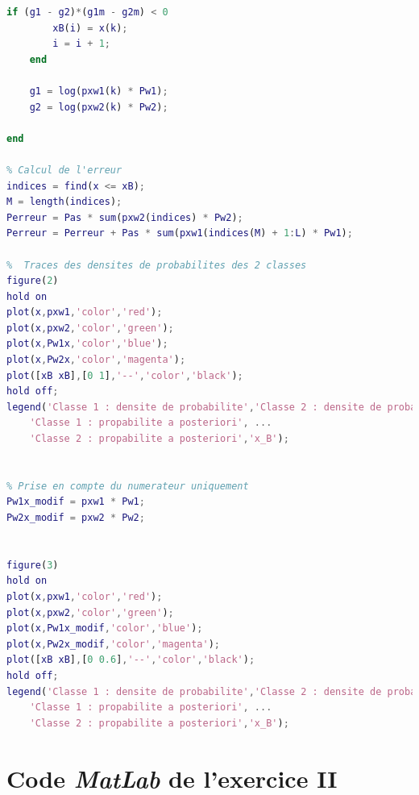 \documentclass[11pt,a4paper]{article}
\begin{document}
\begin{lstlisting}[language=matlab]
    if (g1 - g2)*(g1m - g2m) < 0
        xB(i) = x(k);
        i = i + 1;
    end
    
    g1 = log(pxw1(k) * Pw1);
    g2 = log(pxw2(k) * Pw2);
    
end

% Calcul de l'erreur
indices = find(x <= xB);
M = length(indices);
Perreur = Pas * sum(pxw2(indices) * Pw2);
Perreur = Perreur + Pas * sum(pxw1(indices(M) + 1:L) * Pw1);

%  Traces des densites de probabilites des 2 classes
figure(2) 
hold on
plot(x,pxw1,'color','red');
plot(x,pxw2,'color','green');
plot(x,Pw1x,'color','blue');
plot(x,Pw2x,'color','magenta');
plot([xB xB],[0 1],'--','color','black');
hold off;
legend('Classe 1 : densite de probabilite','Classe 2 : densite de probabilite', ...
	'Classe 1 : propabilite a posteriori', ...
	'Classe 2 : propabilite a posteriori','x_B');

    
% Prise en compte du numerateur uniquement
Pw1x_modif = pxw1 * Pw1;
Pw2x_modif = pxw2 * Pw2;


figure(3) 
hold on
plot(x,pxw1,'color','red');
plot(x,pxw2,'color','green');
plot(x,Pw1x_modif,'color','blue');
plot(x,Pw2x_modif,'color','magenta');
plot([xB xB],[0 0.6],'--','color','black');
hold off;
legend('Classe 1 : densite de probabilite','Classe 2 : densite de probabilite', ...
	'Classe 1 : propabilite a posteriori', ...
	'Classe 2 : propabilite a posteriori','x_B');
\end{lstlisting}

\newpage
\section{Code \emph{MatLab} de l'exercice II}
\end{document}
